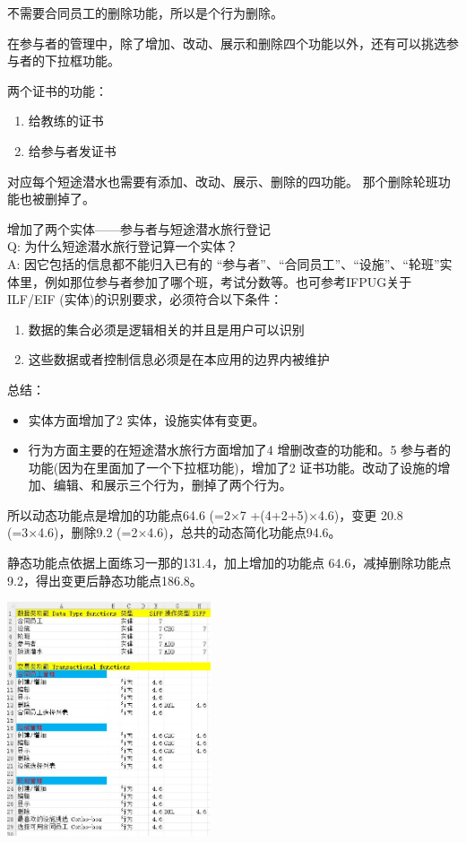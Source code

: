 不需要合同员工的删除功能，所以是个行为删除。

在参与者的管理中，除了增加、改动、展示和删除四个功能以外，还有可以挑选参与者的下拉框功能。

两个证书的功能：

\begin{enumerate}
\tightlist
\item
  给教练的证书
\item
  给参与者发证书
\end{enumerate}

对应每个短途潜水也需要有添加、改动、展示、删除的四功能。
那个删除轮班功能也被删掉了。

增加了两个实体------参与者与短途潜水旅行登记\\
Q: 为什么短途潜水旅行登记算一个实体？\\
A: 因它包括的信息都不能归入已有的
``参与者''、``合同员工''、``设施''、``轮班''实体里，例如那位参与者参加了哪个班，考试分数等。也可参考IFPUG关于ILF/EIF
(实体)的识别要求，必须符合以下条件：

\begin{enumerate}
\tightlist
\item
  数据的集合必须是逻辑相关的并且是用户可以识别
\item
  这些数据或者控制信息必须是在本应用的边界内被维护
\end{enumerate}

总结：

\begin{itemize}
\tightlist
\item
  实体方面增加了2 实体，设施实体有变更。
\item
  行为方面主要的在短途潜水旅行方面增加了4 增删改查的功能和。5
  参与者的功能(因为在里面加了一个下拉框功能)，增加了2
  证书功能。改动了设施的增加、编辑、和展示三个行为，删掉了两个行为。
\end{itemize}

所以动态功能点是增加的功能点64.6 (=2×7 +(4+2+5)×4.6)，变更 20.8
(=3×4.6)，删除9.2 (=2×4.6)，总共的动态简化功能点94.6。

静态功能点依据上面练习一那的131.4，加上增加的功能点
64.6，减掉删除功能点9.2，得出变更后静态功能点186.8。


\includegraphics[width=6cm]{Ex2XlsScreenshot_2022-04-05_143941.jpg}

